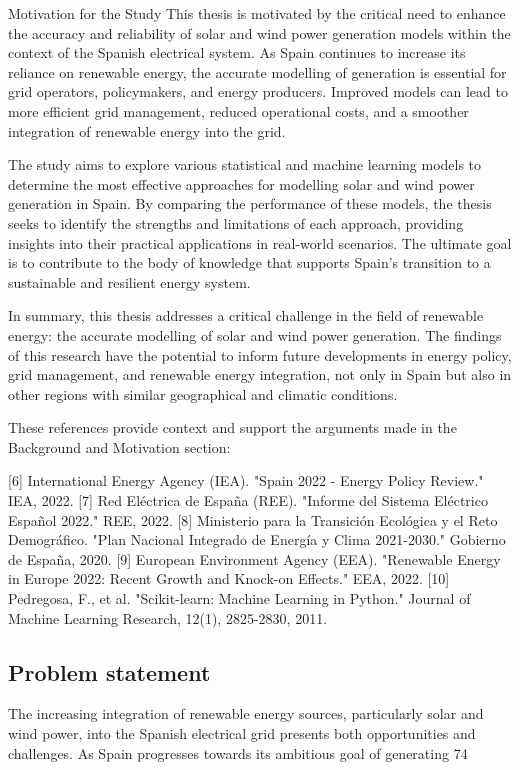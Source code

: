 Motivation for the Study
This thesis is motivated by the critical need to enhance the accuracy and reliability of solar and wind power generation models within the context of the Spanish electrical system. As Spain continues to increase its reliance on renewable energy, the accurate modelling of generation is essential for grid operators, policymakers, and energy producers. Improved models can lead to more efficient grid management, reduced operational costs, and a smoother integration of renewable energy into the grid.

The study aims to explore various statistical and machine learning models to determine the most effective approaches for modelling solar and wind power generation in Spain. By comparing the performance of these models, the thesis seeks to identify the strengths and limitations of each approach, providing insights into their practical applications in real-world scenarios. The ultimate goal is to contribute to the body of knowledge that supports Spain's transition to a sustainable and resilient energy system.

In summary, this thesis addresses a critical challenge in the field of renewable energy: the accurate modelling of solar and wind power generation. The findings of this research have the potential to inform future developments in energy policy, grid management, and renewable energy integration, not only in Spain but also in other regions with similar geographical and climatic conditions.

These references provide context and support the arguments made in the Background and Motivation section:

[6] International Energy Agency (IEA). "Spain 2022 - Energy Policy Review." IEA, 2022.
[7] Red Eléctrica de España (REE). "Informe del Sistema Eléctrico Español 2022." REE, 2022.
[8] Ministerio para la Transición Ecológica y el Reto Demográfico. "Plan Nacional Integrado de Energía y Clima 2021-2030." Gobierno de España, 2020.
[9] European Environment Agency (EEA). "Renewable Energy in Europe 2022: Recent Growth and Knock-on Effects." EEA, 2022.
[10] Pedregosa, F., et al. "Scikit-learn: Machine Learning in Python." Journal of Machine Learning Research, 12(1), 2825-2830, 2011.

\subsection{Problem statement}

The increasing integration of renewable energy sources, particularly solar and wind power, into the Spanish electrical grid presents both opportunities and challenges. As Spain progresses towards its ambitious goal of generating 74%

